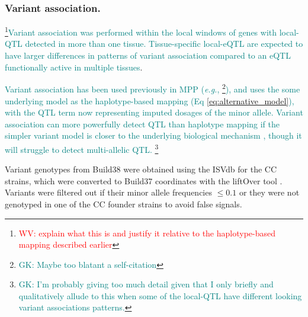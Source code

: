\documentclass[9pt,twocolumn,twoside]{gsajnl}
\newcommand{\eg}{\emph{e.g.}\xspace}
\newcommand{\WV}[2]{\textcolor{red}{#1\footnote{\textcolor{red}{WV: #2}}}}
\newcommand{\GK}[2]{\textcolor{teal}{#1\footnote{\textcolor{teal}{GK: #2}}}}
\newcommand{\GKinline}[1]{\textcolor{teal}{#1}}
\begin{document}
\subsubsection{Variant association.}

\WV{}{explain what this is and justify it relative to the haplotype-based mapping described earlier}\GKinline{Variant association was performed within the local windows of genes with local-QTL detected in more than one tissue. Tissue-specific local-eQTL are expected to have larger differences in patterns of variant association compared to an eQTL functionally active in multiple tissues}. 

\GKinline{Variant association has been used previously in MPP (\eg, \citealt{Baud2014, Keele2018}\GK{}{Maybe too blatant a self-citation}), and uses the some underlying model as the haplotype-based mapping (Eq \ref{eq:alternative_model}), with the QTL term now representing imputed dosages of the minor allele. Variant association can more powerfully detect QTL than haplotype mapping if the simpler variant model is closer to the underlying biological mechanism \citep{Yalcin2005}, though it will struggle to detect multi-allelic QTL.} \GK{}{I'm probably giving too much detail given that I only briefly and qualitatively allude to this when some of the local-QTL have different looking variant associations patterns.}

Variant genotypes from Build38 were obtained using the ISVdb \citep{Oreper2017} for the CC strains, which were converted to Build37 coordinates with the liftOver tool \citep{Lawrence2009}. Variants were filtered out if their minor allele frequencies $\le 0.1$ or they were not genotyped in one of the CC founder strains to avoid false signals.
\end{document}
